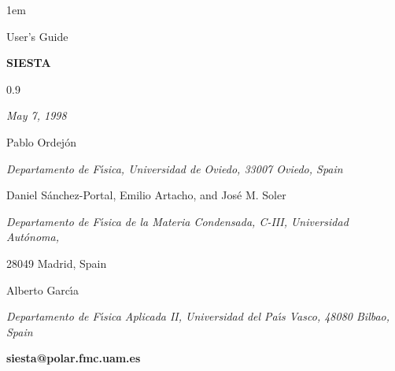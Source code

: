 %
%



\textheight 22cm
\textwidth 16cm
\oddsidemargin 1mm
\topmargin -15mm

\baselineskip=14pt
\parskip 5pt
\parindent 1em




\begin{titlepage}

\begin{center}

\vspace{1cm}

{\huge {\sc User's Guide}}

\vspace{3cm}

{\Huge {\bf SIESTA}}

\vspace{1cm}

{\Huge 0.9}

\vspace{3cm}

{\Large {\it May 7, 1998} }

\vspace{3cm}

{\Large Pablo Ordej\'on}

\vspace{5pt}

{\it Departamento de F\'{\i}sica, Universidad de
Oviedo, 33007 Oviedo, Spain}

\vspace{7mm}

{\Large Daniel S\'anchez-Portal, Emilio Artacho, and Jos\'e M. Soler}

\vspace{5pt}
 
{\it Departamento de F\'{\i}sica de la Materia Condensada, C-III,
Universidad Aut\'onoma, 

28049 Madrid, Spain} 

\vspace{7mm}

{\Large Alberto Garc\'{\i}a}

\vspace{5pt}

{\it Departamento de F\'{\i}sica Aplicada II,
Universidad del Pa\'{\i}s Vasco, 48080 Bilbao, Spain}


\vspace{2cm}
{\bf siesta@polar.fmc.uam.es}

\end{center}

\end{titlepage}

